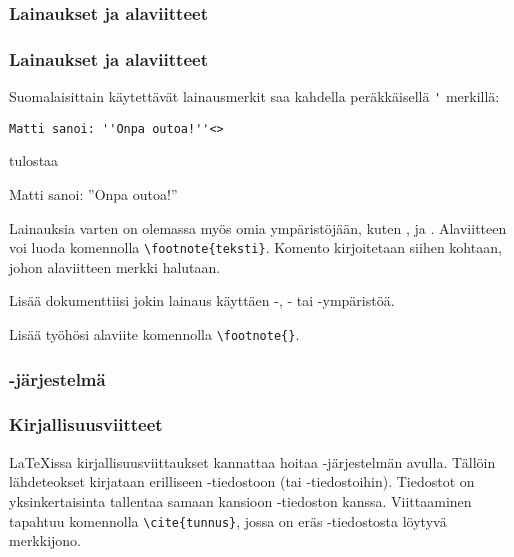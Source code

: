 \subsubsection{Lainaukset ja alaviitteet}
\begin{fframe}
    \frametitle{Lainaukset ja alaviitteet}
    Suomalaisittain käytettävät lainausmerkit saa kahdella peräkkäisellä \lstinline-'- merkillä:
    \begin{lstlisting}
Matti sanoi: ''Onpa outoa!''<>
    \end{lstlisting}
    tulostaa
    \begin{sample}
        Matti sanoi: ''Onpa outoa!''
    \end{sample}
    Lainauksia varten on olemassa myös omia ympäristöjään, kuten ,  ja .
    \vaihto
    Alaviitteen voi luoda komennolla \lstinline-\footnote{teksti}-. Komento kirjoitetaan siihen kohtaan, johon alaviitteen merkki halutaan. 
\end{fframe}

\begin{fframe}
    \begin{harj}
        Lisää dokumenttiisi jokin lainaus käyttäen -, - tai -ympäristöä. 
    \end{harj}
    \begin{harj}
        Lisää työhösi alaviite komennolla \lstinline-\footnote{}-. 
    \end{harj}
\end{fframe}

\subsubsection{\BibTeX-järjestelmä}
\begin{fframe}
    \frametitle{Kirjallisuusviitteet}
    \LaTeX issa kirjallisuusviittaukset kannattaa hoitaa \BibTeX-järjestelmän avulla. 
    \vaihto
    Tällöin lähdeteokset kirjataan erilliseen -tiedostoon (tai -tiedostoihin).
    \vaihto
    Tiedostot on yksinkertaisinta tallentaa samaan kansioon -tiedoston kanssa.
    \vaihto
    Viittaaminen tapahtuu komennolla \lstinline-\cite{tunnus}-, jossa  on eräs -tiedostosta löytyvä merkkijono.
\end{fframe}

